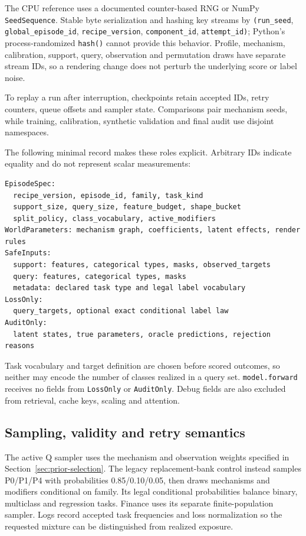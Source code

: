 \documentclass[11pt]{article}
\begin{document}
The CPU reference uses a documented counter-based RNG or NumPy \texttt{SeedSequence}. Stable byte serialization and hashing key streams by \texttt{(run\_seed}, \texttt{global\_episode\_id}, \texttt{recipe\_version}, \texttt{component\_id}, \texttt{attempt\_id)}; Python's process-randomized \texttt{hash()} cannot provide this behavior. Profile, mechanism, calibration, support, query, observation and permutation draws have separate stream IDs, so a rendering change does not perturb the underlying score or label noise.

To replay a run after interruption, checkpoints retain accepted IDs, retry counters, queue offsets and sampler state. Comparisons pair mechanism seeds, while training, calibration, synthetic validation and final audit use disjoint namespaces.

The following minimal record makes these roles explicit. Arbitrary IDs indicate equality and do not represent scalar measurements:
\begin{lstlisting}
EpisodeSpec:
  recipe_version, episode_id, family, task_kind
  support_size, query_size, feature_budget, shape_bucket
  split_policy, class_vocabulary, active_modifiers
WorldParameters: mechanism graph, coefficients, latent effects, render rules
SafeInputs:
  support: features, categorical types, masks, observed_targets
  query: features, categorical types, masks
  metadata: declared task type and legal label vocabulary
LossOnly:
  query_targets, optional exact conditional label law
AuditOnly:
  latent states, true parameters, oracle predictions, rejection reasons
\end{lstlisting}
Task vocabulary and target definition are chosen before scored outcomes, so neither may encode the number of classes realized in a query set. \texttt{model.forward} receives no fields from \texttt{LossOnly} or \texttt{AuditOnly}. Debug fields are also excluded from retrieval, cache keys, scaling and attention.

\subsection{Sampling, validity and retry semantics}

The active Q sampler uses the mechanism and observation weights specified in Section~\ref{sec:prior-selection}. The legacy replacement-bank control instead samples P0/P1/P4 with probabilities 0.85/0.10/0.05, then draws mechanisms and modifiers conditional on family. Its legal conditional probabilities balance binary, multiclass and regression tasks. Finance uses its separate finite-population sampler. Logs record accepted task frequencies and loss normalization so the requested mixture can be distinguished from realized exposure.
\end{document}
